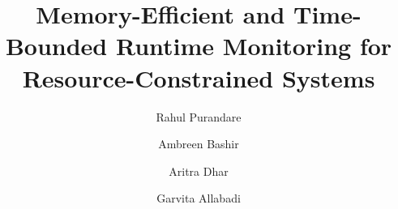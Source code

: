 \documentclass{llncs2e/llncs}
\begin{document}
\setlength{\pdfpageheight}{\paperheight}
\setlength{\pdfpagewidth}{\paperwidth}

\newcommand{\ignore}[1]{}






\title{Memory-Efficient and Time-Bounded Runtime Monitoring for Resource-Constrained Systems}

\author{Rahul Purandare \and Ambreen Bashir \and Aritra Dhar \and Garvita Allabadi}

      

\maketitle
\end{document}
